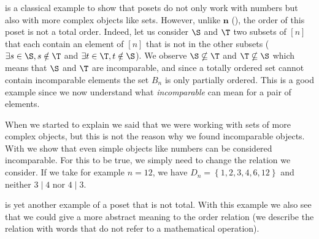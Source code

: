  is a classical example to show that posets do not only
work with numbers but also with more complex objects like sets. However, unlike
$\bm{n}$ (), the order of this poset is not a total order.
Indeed, let us consider $\S$ and $\T$ two subsets of $[n]$ that each contain an
element of $[n]$ that is not in the other subsets ($\exists s \in \S, s \notin
\T$ and $\exists t \in \T, t \notin \S$). We observe $\S \nsubseteq \T$ and $\T
\nsubseteq \S$ which means that $\S$ and $\T$ are incomparable, and since a
totally ordered set cannot contain incomparable elements the set $B_n$ is only
partially ordered. This is a good example since we now understand what
\emph{incomparable} can mean for a pair of elements.


When we started to explain  we said that we were working
with sets of more complex objects, but this is not the reason why we found
incomparable objects. With  we show that even simple
objects like numbers can be considered incomparable. For this to be true, we
simply need to change the relation we consider. If we take for example $n =
12$, we have $D_n = \left\{{1, 2, 3, 4, 6, 12}\right\}$ and neither $3 \mid 4$
nor $4 \mid 3$.


 is yet another example of a poset that is not total. With
this example we also see that we could give a more abstract meaning to the
order relation (we describe the relation with words that do not refer to a
mathematical operation).
